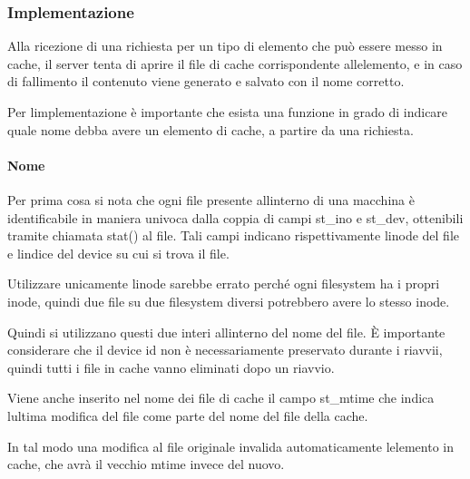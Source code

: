 \documentclass[a4paper,11pt]{article}
\begin{document}
\bigskip

\subsubsection[Implementazione]{Implementazione}
{\sffamily
Alla ricezione di una richiesta per un tipo di elemento che pu\`o essere
messo in cache, il server tenta di aprire il file di cache
corrispondente all{\textquotesingle}elemento, e in caso di fallimento
il contenuto viene generato e salvato con il nome corretto.}


\bigskip

{\sffamily
Per l{\textquotesingle}implementazione \`e importante che esista una
funzione in grado di indicare quale nome debba avere un elemento di
cache, a partire da una richiesta.}


\bigskip

\paragraph{Nome}
{\sffamily
Per prima cosa si nota che ogni file presente
all{\textquotesingle}interno di una macchina \`e identificabile in
maniera univoca dalla coppia di campi st\_ino e st\_dev, ottenibili
tramite chiamata stat() al file. Tali campi indicano rispettivamente
l{\textquotesingle}inode del file e l{\textquotesingle}indice del
device su cui si trova il file.}

{\sffamily
Utilizzare unicamente l{\textquotesingle}inode sarebbe errato perch\'e
ogni filesystem ha i propri inode, quindi due file su due filesystem
diversi potrebbero avere lo stesso inode\cite{LIBC10}.}


\bigskip

{\sffamily
Quindi si utilizzano questi due interi all{\textquotesingle}interno del
nome del file. \`E importante considerare che il device id non \`e
necessariamente preservato durante i riavvii, quindi tutti i file in
cache vanno eliminati dopo un riavvio\cite{LIBC11}.}


\bigskip

{\sffamily
Viene anche inserito nel nome dei file di cache il campo st\_mtime che
indica l{\textquotesingle}ultima modifica del file\cite{LIBC11}\cite{LIBC12} come
parte del nome del file della cache.}

{\sffamily
In tal modo una modifica al file originale invalida automaticamente
l{\textquotesingle}elemento in cache, che avr\`a il vecchio mtime
invece del nuovo.}


\bigskip
\end{document}
